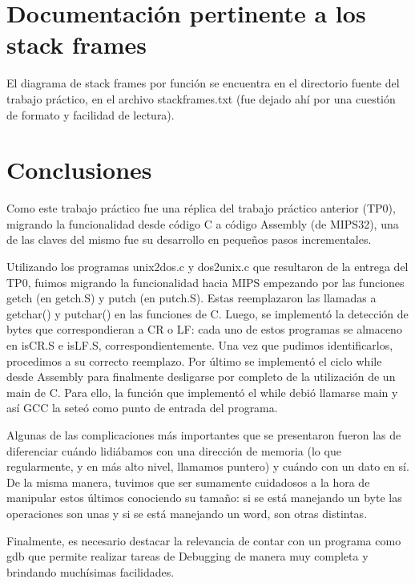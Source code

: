 \documentclass[a4paper,11pt]{article}
\begin{document}
\section{Documentación pertinente a los stack frames}

El diagrama de stack frames por función se encuentra en el directorio fuente del trabajo práctico, en el archivo stackframes.txt (fue dejado ahí por una cuestión de formato y facilidad de lectura).

\section{Conclusiones}

Como este trabajo práctico fue una réplica del trabajo práctico anterior (TP0), migrando la funcionalidad desde código C a código Assembly (de MIPS32), una de las claves del mismo fue su desarrollo en pequeños pasos incrementales.

\indent
Utilizando los programas unix2dos.c y dos2unix.c que resultaron de la entrega del TP0, fuimos migrando la funcionalidad hacia MIPS empezando por las funciones getch (en getch.S) y putch (en putch.S). Estas reemplazaron las llamadas a getchar() y putchar() en las funciones de C. Luego, se implementó la detección de bytes que correspondieran a CR o LF: cada uno de estos programas se almaceno en isCR.S e isLF.S, correspondientemente. Una vez que pudimos identificarlos, procedimos a su correcto reemplazo.
Por último se implementó el ciclo while desde Assembly para finalmente desligarse por completo de la utilización de un main de C. Para ello, la función que implementó el while debió llamarse main y así GCC la seteó como punto de entrada del programa.

\indent
Algunas de las complicaciones más importantes que se presentaron fueron las de diferenciar cuándo lidiábamos con una dirección de memoria (lo que regularmente, y en más alto nivel, llamamos puntero) y cuándo con un dato en sí. De la misma manera, tuvimos que ser sumamente cuidadosos a la hora de manipular estos últimos conociendo su tamaño: si se está manejando un byte las operaciones son unas y si se está manejando un word, son otras distintas.

\indent
Finalmente, es necesario destacar la relevancia de contar con un programa como gdb que permite realizar tareas de Debugging de manera muy completa y brindando muchísimas facilidades.
\end{document}
